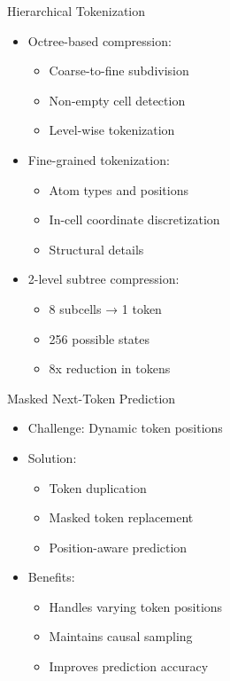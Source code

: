 \begin{frame}{Hierarchical Tokenization}
    \begin{itemize}
        \item Octree-based compression:
        \begin{itemize}
            \item Coarse-to-fine subdivision
            \item Non-empty cell detection
            \item Level-wise tokenization
        \end{itemize}
        \item Fine-grained tokenization:
        \begin{itemize}
            \item Atom types and positions
            \item In-cell coordinate discretization
            \item Structural details
        \end{itemize}
        \item 2-level subtree compression:
        \begin{itemize}
            \item 8 subcells → 1 token
            \item 256 possible states
            \item 8x reduction in tokens
        \end{itemize}
    \end{itemize}
\end{frame}

\begin{frame}{Masked Next-Token Prediction}
    \begin{itemize}
        \item Challenge: Dynamic token positions
        \item Solution:
        \begin{itemize}
            \item Token duplication
            \item Masked token replacement
            \item Position-aware prediction
        \end{itemize}
        \item Benefits:
        \begin{itemize}
            \item Handles varying token positions
            \item Maintains causal sampling
            \item Improves prediction accuracy
        \end{itemize}
    \end{itemize}
\end{frame}

